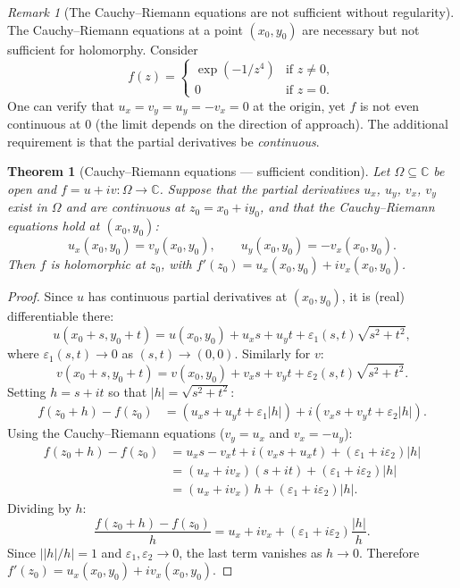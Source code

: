 \documentclass[12pt,a4paper,openany]{book}
\theoremstyle{definition}
\theoremstyle{plain}
\newtheorem{theorem}[definition]{Theorem}
\theoremstyle{remark}
\newtheorem{remark}[definition]{Remark}
\newcommand{\C}{\mathbb{C}}
\newcommand{\abs}[1]{\left|#1\right|}
\begin{document}
\begin{remark}[The Cauchy--Riemann equations are not sufficient without regularity]
\label{rem:CR-not-sufficient}
The Cauchy--Riemann equations at a point $(x_0,y_0)$ are necessary but not sufficient for holomorphy. Consider
\[
  f(z) = \begin{cases} \exp(-1/z^4) & \text{if } z\neq 0, \\ 0 & \text{if } z=0. \end{cases}
\]
One can verify that $u_x = v_y = u_y = -v_x = 0$ at the origin, yet $f$ is not even continuous at $0$ (the limit depends on the direction of approach). The additional requirement is that the partial derivatives be \emph{continuous}.
\end{remark}

\begin{theorem}[Cauchy--Riemann equations --- sufficient condition]
\label{thm:CR-sufficient}
Let $\Omega\subseteq\C$ be open and $f = u+iv:\Omega\to\C$. Suppose that the partial derivatives $u_x$, $u_y$, $v_x$, $v_y$ exist in $\Omega$ and are \emph{continuous} at $z_0 = x_0+iy_0$, and that the Cauchy--Riemann equations hold at $(x_0,y_0)$:
\[
  u_x(x_0,y_0) = v_y(x_0,y_0), \qquad u_y(x_0,y_0) = -v_x(x_0,y_0).
\]
Then $f$ is holomorphic at $z_0$, with $f'(z_0) = u_x(x_0,y_0)+iv_x(x_0,y_0)$.
\end{theorem}

\begin{proof}
Since $u$ has continuous partial derivatives at $(x_0,y_0)$, it is (real) differentiable there:
\[
  u(x_0+s,y_0+t) = u(x_0,y_0) + u_x s + u_y t + \varepsilon_1(s,t)\sqrt{s^2+t^2},
\]
where $\varepsilon_1(s,t)\to 0$ as $(s,t)\to(0,0)$. Similarly for $v$:
\[
  v(x_0+s,y_0+t) = v(x_0,y_0) + v_x s + v_y t + \varepsilon_2(s,t)\sqrt{s^2+t^2}.
\]
Setting $h = s+it$ so that $\abs{h} = \sqrt{s^2+t^2}$:
\begin{align*}
  f(z_0+h)-f(z_0) &= (u_x s + u_y t + \varepsilon_1\abs{h}) + i(v_x s + v_y t + \varepsilon_2\abs{h}).
\end{align*}
Using the Cauchy--Riemann equations ($v_y = u_x$ and $v_x = -u_y$):
\begin{align*}
  f(z_0+h)-f(z_0) &= u_x s - v_x t + i(v_x s + u_x t) + (\varepsilon_1+i\varepsilon_2)\abs{h} \\
                    &= (u_x+iv_x)(s+it) + (\varepsilon_1+i\varepsilon_2)\abs{h} \\
                    &= (u_x+iv_x)\,h + (\varepsilon_1+i\varepsilon_2)\abs{h}.
\end{align*}
Dividing by $h$:
\[
  \frac{f(z_0+h)-f(z_0)}{h} = u_x+iv_x + (\varepsilon_1+i\varepsilon_2)\frac{\abs{h}}{h}.
\]
Since $\abs{\abs{h}/h} = 1$ and $\varepsilon_1,\varepsilon_2\to 0$, the last term vanishes as $h\to 0$. Therefore $f'(z_0) = u_x(x_0,y_0)+iv_x(x_0,y_0)$.
\end{proof}
\end{document}
